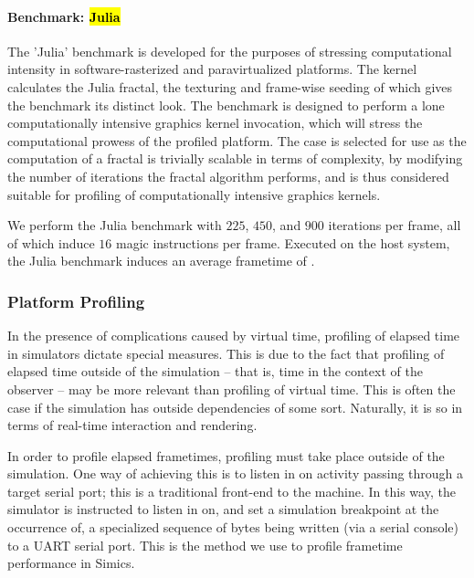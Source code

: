 \paragraph{Benchmark: \hl{Julia}}
\label{par:experimentalmethodology_benchmarking_benchmarkjulia}
The 'Julia' benchmark is developed for the purposes of stressing computational intensity in software-rasterized and paravirtualized platforms.
The kernel calculates the Julia fractal, the texturing and frame-wise seeding of which gives the benchmark its distinct look.
The benchmark is designed to perform a lone computationally intensive graphics kernel invocation, which will stress the computational prowess of the profiled platform.
The case is selected for use as the computation of a fractal is trivially scalable in terms of complexity, by modifying the number of iterations the fractal algorithm performs, and is thus considered suitable for profiling of computationally intensive graphics kernels.

We perform the Julia benchmark with $225$, $450$, and $900$ iterations per frame, all of which induce $16$ magic instructions per frame.
Executed on the host system, the Julia benchmark induces an average frametime of  \milli\second .

\subsubsection{Platform Profiling}
\label{sec:platformprofiling}
In the presence of complications caused by virtual time, profiling of elapsed time in simulators dictate special measures.
This is due to the fact that profiling of elapsed time outside of the simulation -- that is, time in the context of the observer -- may be more relevant than profiling of virtual time.
This is often the case if the simulation has outside dependencies of some sort.
Naturally, it is so in terms of real-time interaction and rendering.

In order to profile elapsed frametimes, profiling must take place outside of the simulation.
One way of achieving this is to listen in on activity passing through a target serial port; this is a traditional front-end to the machine.
In this way, the simulator is instructed to listen in on, and set a simulation breakpoint at the occurrence of, a specialized sequence of bytes being written (via a serial console) to a UART serial port.
This is the method we use to profile frametime performance in Simics.

